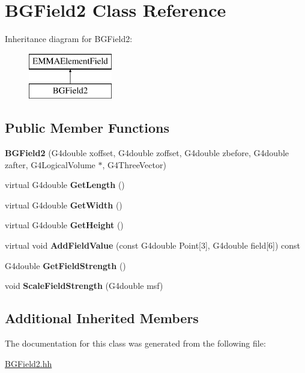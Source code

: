 \hypertarget{classBGField2}{\section{B\-G\-Field2 Class Reference}
\label{classBGField2}
}
Inheritance diagram for B\-G\-Field2\-:\begin{figure}[H]
\begin{center}
\leavevmode
\includegraphics[height=2.000000cm]{classBGField2}
\end{center}
\end{figure}
\subsection*{Public Member Functions}
\begin{DoxyCompactItemize}
\item 
\hypertarget{classBGField2_abd68036adc384301852a843bb85bc704}{{\bfseries B\-G\-Field2} (G4double xoffset, G4double zoffset, G4double zbefore, G4double zafter, G4\-Logical\-Volume $\ast$, G4\-Three\-Vector)}\label{classBGField2_abd68036adc384301852a843bb85bc704}

\item 
\hypertarget{classBGField2_a856d0ce173b04e35c0e59ab14694d6ac}{virtual G4double {\bfseries Get\-Length} ()}\label{classBGField2_a856d0ce173b04e35c0e59ab14694d6ac}

\item 
\hypertarget{classBGField2_aa73fc7a95de254dd1aaba6d7b6248c68}{virtual G4double {\bfseries Get\-Width} ()}\label{classBGField2_aa73fc7a95de254dd1aaba6d7b6248c68}

\item 
\hypertarget{classBGField2_a8eb93f9ddd438617d363e8b194908d64}{virtual G4double {\bfseries Get\-Height} ()}\label{classBGField2_a8eb93f9ddd438617d363e8b194908d64}

\item 
\hypertarget{classBGField2_a6300d564c8722820ee8dd7d215283116}{virtual void {\bfseries Add\-Field\-Value} (const G4double Point\mbox{[}3\mbox{]}, G4double field\mbox{[}6\mbox{]}) const }\label{classBGField2_a6300d564c8722820ee8dd7d215283116}

\item 
\hypertarget{classBGField2_ac93970710ba6895256e4dba9ce459c1c}{G4double {\bfseries Get\-Field\-Strength} ()}\label{classBGField2_ac93970710ba6895256e4dba9ce459c1c}

\item 
\hypertarget{classBGField2_ae7f476b27eace05e7c6a6176e774eb77}{void {\bfseries Scale\-Field\-Strength} (G4double msf)}\label{classBGField2_ae7f476b27eace05e7c6a6176e774eb77}

\end{DoxyCompactItemize}
\subsection*{Additional Inherited Members}


The documentation for this class was generated from the following file\-:\begin{DoxyCompactItemize}
\item 
\hyperlink{BGField2_8hh}{B\-G\-Field2.\-hh}\end{DoxyCompactItemize}
